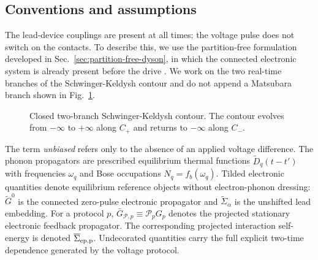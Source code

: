 \documentclass[
 reprint,
 superscriptaddress,
 amsmath,amssymb,
 aps,prb,
 longbibliography,
 floatfix
]{revtex4-2}
\newcommand{\barSigma}{\overline{\Sigma}}
\newcommand{\proj}{\mathcal P}
\begin{document}
\subsection{Conventions and assumptions}
\label{sec:assumptions}

The lead-device couplings are present at all times; the voltage pulse does not switch on the contacts. To describe this, we use the partition-free formulation developed in Sec.~\ref{sec:partition-free-dyson}, in which the connected electronic system is already present before the drive \cite{Cini1980,StefanucciAlmbladh2004}. We work on the two real-time branches of the Schwinger-Keldysh contour and do not append a Matsubara branch shown in Fig.~\ref{fig:keldysh-contour}.
\begin{figure}[ht]
\centering
{}
\caption{
Closed two-branch Schwinger-Keldysh contour. The contour evolves from $-\infty$ to $+\infty$ along \(C_+\) and returns to $-\infty$ along \(C_-\).}
\label{fig:keldysh-contour}
\end{figure}
The term \emph{unbiased} refers only to the absence of an applied voltage difference. The phonon propagators are prescribed equilibrium thermal functions \(\widetilde D_q(t-t')\) with frequencies \(\omega_q\) and Bose occupations \(N_q=f_b(\omega_q)\). Tilded electronic quantities denote equilibrium reference objects without electron-phonon dressing: \(\widetilde G^0\) is the connected zero-pulse electronic propagator and \(\widetilde\Sigma_\alpha\) is the unshifted lead embedding. For a protocol \(p\), \(\bar G_{\mathcal P,p}\equiv\proj_p G_p\) denotes the projected stationary electronic feedback propagator. The corresponding projected interaction self-energy is denoted \(\barSigma_{\rm ep,p}\). Undecorated quantities carry the full explicit two-time dependence generated by the voltage protocol.
\end{document}
